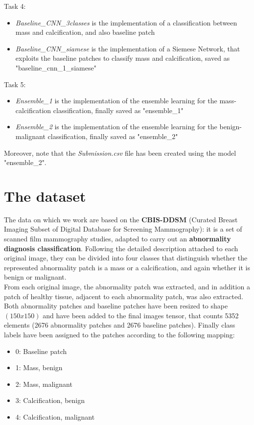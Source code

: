 \documentclass[11pt,a4paper,oneside]{article}
\begin{document}
Task 4:
\begin{itemize}
\item \textit{Baseline\_CNN\_3classes} is the implementation of a classification between mass and calcification, and also baseline patch
\item \textit{Baseline\_CNN\_siamese} is the implementation of a Siemese Network, that exploits the baseline patches to classify mass and calcification, saved as "baseline\_cnn\_1\_siamese"
\end{itemize}
Task 5:
\begin{itemize}
\item \textit{Ensemble\_1} is the implementation of the ensemble learning for the mass-calcification classification, finally saved as "ensemble\_1"
\item \textit{Ensemble\_2} is the implementation of the ensemble learning for the benign-malignant classification, finally saved as "ensemble\_2"
\end{itemize}
\vspace{10mm}
Moreover, note that the \textit{Submission.csv} file has been created using the model "ensemble\_2".

\clearpage

\section{The dataset}
The data on which we work are based on the \textbf{CBIS-DDSM} (Curated Breast Imaging Subset of Digital Database for Screening Mammography): it is a set of scanned film mammography studies, adapted to carry out an \textbf{abnormality diagnosis classification}. Following the detailed description attached to each original image, they can be divided into four classes that distinguish whether the represented abnormality patch is a mass or a calcification, and again whether it is benign or malignant. \\
From each original image, the abnormality patch was extracted, and in addition a patch of healthy tissue, adjacent to each abnormality patch, was also extracted. Both abnormality patches and baseline patches have been resized to shape $(150x150)$ and have been added to the final images tensor, that counts 5352 elements (2676 abnormality patches and 2676 baseline patches).
Finally class labels have been assigned to the patches according to the following mapping:
\begin{itemize}
\item 0: Baseline patch
\item 1: Mass, benign
\item 2: Mass, malignant
\item 3: Calcification, benign
\item 4: Calcification, malignant
\end{itemize}
\end{document}
